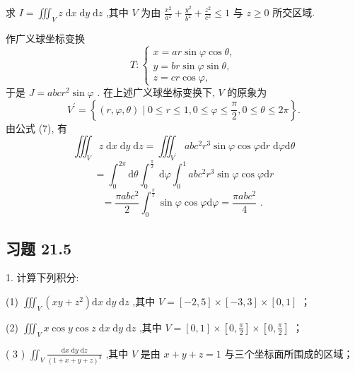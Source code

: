 \begin{example}

\end{example}
求 \(I = {\iiint }_{V}z\mathrm{\;d}x\mathrm{\;d}y\mathrm{\;d}z\) ,其中 \(V\) 为由 \(\frac{{x}^{2}}{{a}^{2}} + \frac{{y}^{2}}{{b}^{2}} + \frac{{z}^{2}}{{c}^{2}} \leq  1\) 与 \(z \geq  0\) 所交区域.

\begin{solution}

\end{solution}
作广义球坐标变换
\[
T : \left\{  \begin{array}{l} x = {ar}\sin \varphi \cos \theta , \\  y = {br}\sin \varphi \sin \theta , \\  z = {cr}\cos \varphi , \end{array}\right.
\]
于是 \(J = {abc}{r}^{2}\sin \varphi\) . 在上述广义球坐标变换下, \(V\) 的原象为
\[
{V}^{\prime } = \left\{  {\left( {r,\varphi ,\theta }\right)  \mid  0 \leq  r \leq  1,0 \leq  \varphi  \leq  \frac{\pi }{2},0 \leq  \theta  \leq  {2\pi }}\right\}  .
\]
由公式 (7), 有
\[
{\iiint }_{V}z\mathrm{\;d}x\mathrm{\;d}y\mathrm{\;d}z = {\iiint }_{{V}^{\prime }}{ab}{c}^{2}{r}^{3}\sin \varphi \cos \varphi \mathrm{d}r\mathrm{\;d}\varphi \mathrm{d}\theta
\]
\[
= {\int }_{0}^{2\pi }\mathrm{d}\theta {\int }_{0}^{\frac{\pi }{2}}\mathrm{\;d}\varphi {\int }_{0}^{1}{ab}{c}^{2}{r}^{3}\sin \varphi \cos \varphi \mathrm{d}r
\]
\[
= \frac{{\pi ab}{c}^{2}}{2}{\int }_{0}^{\frac{\pi }{2}}\sin \varphi \cos \varphi \mathrm{d}\varphi  = \frac{{\pi ab}{c}^{2}}{4}\text{ . }
\]
\subsection{习题 21.5}

1. 计算下列积分:

(1) \({\iiint }_{V}\left( {{xy} + {z}^{2}}\right) \mathrm{d}x\mathrm{\;d}y\mathrm{\;d}z\) ,其中 \(V = \left\lbrack  {-2,5}\right\rbrack   \times  \left\lbrack  {-3,3}\right\rbrack   \times  \left\lbrack  {0,1}\right\rbrack\) ；

(2) \({\iiint }_{V}x\cos y\cos z\mathrm{\;d}x\mathrm{\;d}y\mathrm{\;d}z\) ,其中 \(V = \left\lbrack  {0,1}\right\rbrack   \times  \left\lbrack  {0,\frac{\pi }{2}}\right\rbrack   \times  \left\lbrack  {0,\frac{\pi }{2}}\right\rbrack\) ；

( 3 ) \({\iint }_{V}\frac{\mathrm{d}x\mathrm{\;d}y\mathrm{\;d}z}{{\left( 1 + x + y + z\right) }^{3}}\) ,其中 \(V\) 是由 \(x + y + z = 1\) 与三个坐标面所围成的区域；

